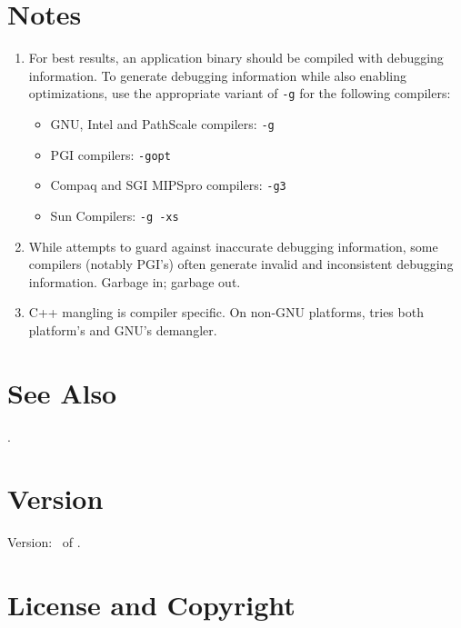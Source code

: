\documentclass[english]{article}
\begin{document}

\section{Notes}

\begin{enumerate}

\item For best results, an application binary should be compiled with debugging information.
To generate debugging information while also enabling optimizations, use the appropriate variant of \verb+-g+ for the following compilers:
\begin{itemize}
\item GNU, Intel and PathScale compilers: \verb+-g+
\item PGI compilers: \verb+-gopt+
\item Compaq and SGI MIPSpro compilers: \verb+-g3+
\item Sun Compilers: \verb+-g -xs+
\end{itemize}

\item While  attempts to guard against inaccurate debugging information, some compilers (notably PGI's) often generate invalid and inconsistent debugging information.
Garbage in; garbage out.

\item C++ mangling is compiler specific. On non-GNU platforms, 
tries both platform's and GNU's demangler.

\end{enumerate}

\section{See Also}

.

\section{Version}

Version: \Version\ of \Date.

\section{License and Copyright}
\end{document}
